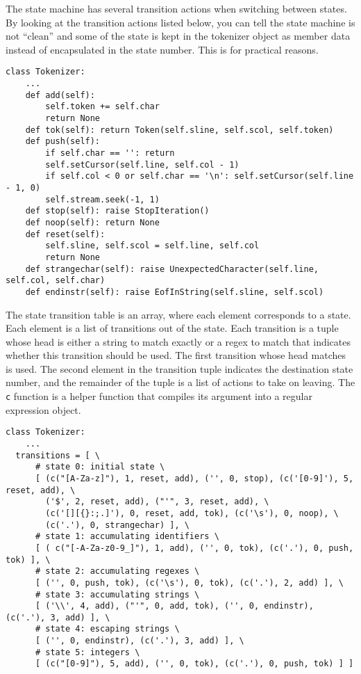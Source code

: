 \documentclass[]{article}
\begin{document}
  The state machine has several transition actions when switching
  between states. By looking at the transition actions listed below,
  you can tell the state machine is not ``clean'' and some of the
  state is kept in the tokenizer object as member data instead of
  encapsulated in the state number. This is for practical reasons.
  \begin{lstlisting}
class Tokenizer:
    ...
    def add(self):
        self.token += self.char
        return None
    def tok(self): return Token(self.sline, self.scol, self.token)
    def push(self):
        if self.char == '': return
        self.setCursor(self.line, self.col - 1)
        if self.col < 0 or self.char == '\n': self.setCursor(self.line - 1, 0)
        self.stream.seek(-1, 1)
    def stop(self): raise StopIteration()
    def noop(self): return None
    def reset(self):
        self.sline, self.scol = self.line, self.col
        return None
    def strangechar(self): raise UnexpectedCharacter(self.line, self.col, self.char)
    def endinstr(self): raise EofInString(self.sline, self.scol)
  \end{lstlisting}
  The state transition table is an array, where each element
  corresponds to a state. Each element is a list of transitions out of
  the state. Each transition is a tuple whose head is either a string
  to match exactly or a regex to match that indicates whether this
  transition should be used. The first transition whose head matches
  is used. The second element in the transition tuple indicates the
  destination state number, and the remainder of the tuple is a list
  of actions to take on leaving. The \verb+c+ function is a helper
  function that compiles its argument into a regular expression object.
  \begin{lstlisting}
class Tokenizer:
    ...
  transitions = [ \
      # state 0: initial state \
      [ (c("[A-Za-z]"), 1, reset, add), ('', 0, stop), (c('[0-9]'), 5, reset, add), \
        ('$', 2, reset, add), ("'", 3, reset, add), \
        (c('[][{}:;.]'), 0, reset, add, tok), (c('\s'), 0, noop), \
        (c('.'), 0, strangechar) ], \
      # state 1: accumulating identifiers \
      [ ( c("[-A-Za-z0-9_]"), 1, add), ('', 0, tok), (c('.'), 0, push, tok) ], \
      # state 2: accumulating regexes \
      [ ('', 0, push, tok), (c('\s'), 0, tok), (c('.'), 2, add) ], \
      # state 3: accumulating strings \
      [ ('\\', 4, add), ("'", 0, add, tok), ('', 0, endinstr), (c('.'), 3, add) ], \
      # state 4: escaping strings \
      [ ('', 0, endinstr), (c('.'), 3, add) ], \
      # state 5: integers \
      [ (c("[0-9]"), 5, add), ('', 0, tok), (c('.'), 0, push, tok) ] ]
  \end{lstlisting} %
\end{document}

